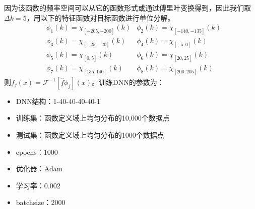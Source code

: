   因为该函数的频率空间可以从它的函数形式或通过傅里叶变换得到，因此我们取$\Delta k=5$，用以下的特征函数对目标函数进行单位分解。
  \begin{equation}\label{}
    \begin{aligned}
      &\phi_1(k) = \chi_{[-205,-200]}(k)  & \phi_2(k) = \chi_{[-140,-135]}(k)\\
      & \phi_3(k) = \chi_{[-25,-20]}(k)  & \phi_4(k) = \chi_{[-5,0]}(k)\\
      &\phi_5(k) = \chi_{[0,5]}(k)   & \phi_6(k) = \chi_{[20,25]}(k)\\
      & \phi_7(k) = \chi_{[135,140]}(k)  & \phi_8(k) = \chi_{[200,205]}(k)
      \end{aligned}
  \end{equation}
  则$f_j(x) = \mathcal{F}^{-1}[\widehat{f}\phi_j](x)$。训练DNN的参数为：
  \begin{itemize}
    \item DNN结构：1-40-40-40-40-1
    \item 训练集：函数定义域上均匀分布的10,000个数据点
    \item 测试集：函数定义域上均匀分布的1000个数据点
    \item epochs：1000
    \item 优化器：Adam
    \item 学习率：0.002
    \item batchsize：2000
  \end{itemize}

